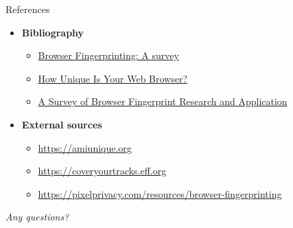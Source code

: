 \begin{frame}{References}
  \begin{itemize}
    \item \textbf{Bibliography}
          \begin{itemize}
            \item \href{https://arxiv.org/pdf/1905.01051.pdf}{Browser Fingerprinting: A survey}
            \item \href{https://coveryourtracks.eff.org/static/browser-uniqueness.pdf}{How Unique Is Your Web Browser?}
            \item \href{https://downloads.hindawi.com/journals/wcmc/2022/3363335.pdf}{A Survey of Browser Fingerprint Research and Application}
          \end{itemize}
    \item \textbf{External sources}
          \begin{itemize}
            \item \href{https://amiunique.org/faq}{https://amiunique.org}
            \item \href{https://coveryourtracks.eff.org/about}{https://coveryourtracks.eff.org}
            \item \href{https://pixelprivacy.com/resources/browser-fingerprinting}{https://pixelprivacy.com/resources/browser-fingerprinting}
          \end{itemize}
  \end{itemize}
\end{frame}

\begin{frame}
  \centering \Huge \emph{Any questions?}
\end{frame}


